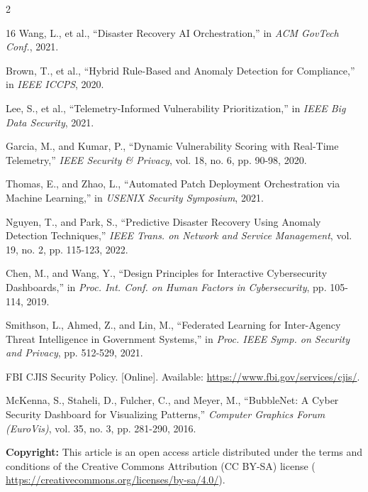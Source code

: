 \documentclass[10pt]{article} %
\begin{document}
\begin{multicols}{2}
\begin{thebibliography}{16}
Wang, L., et al., ``Disaster Recovery AI Orchestration,'' in \textit{ACM GovTech Conf.}, 2021.

Brown, T., et al., ``Hybrid Rule-Based and Anomaly Detection for Compliance,'' in \textit{IEEE ICCPS}, 2020.

Lee, S., et al., ``Telemetry-Informed Vulnerability Prioritization,'' in \textit{IEEE Big Data Security}, 2021.

Garcia, M., and Kumar, P., ``Dynamic Vulnerability Scoring with Real-Time Telemetry,'' \textit{IEEE Security \& Privacy}, vol. 18, no. 6, pp. 90-98, 2020.

Thomas, E., and Zhao, L., ``Automated Patch Deployment Orchestration via Machine Learning,'' in \textit{USENIX Security Symposium}, 2021.

Nguyen, T., and Park, S., ``Predictive Disaster Recovery Using Anomaly Detection Techniques,'' \textit{IEEE Trans. on Network and Service Management}, vol. 19, no. 2, pp. 115-123, 2022.

Chen, M., and Wang, Y., ``Design Principles for Interactive Cybersecurity Dashboards,'' in \textit{Proc. Int. Conf. on Human Factors in Cybersecurity}, pp. 105-114, 2019.

Smithson, L., Ahmed, Z., and Lin, M., ``Federated Learning for Inter-Agency Threat Intelligence in Government Systems,'' in \textit{Proc. IEEE Symp. on Security and Privacy}, pp. 512-529, 2021.

FBI CJIS Security Policy. [Online]. Available: \url{https://www.fbi.gov/services/cjis/}.

McKenna, S., Staheli, D., Fulcher, C., and Meyer, M., ``BubbleNet: A Cyber Security Dashboard for Visualizing Patterns,'' \textit{Computer Graphics Forum (EuroVis)}, vol. 35, no. 3, pp. 281-290, 2016. \newline

\end{thebibliography}


\noindent\textbf{Copyright:} This article is an open access article distributed under the terms and conditions of the Creative Commons Attribution (CC BY-SA) license ( \url{https://creativecommons.org/licenses/by-sa/4.0/}).

\vspace{0.5cm}


\end{multicols}
\end{document}
